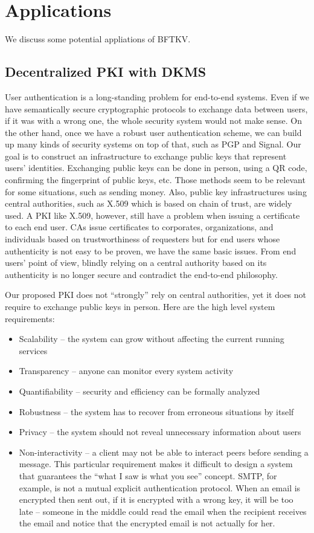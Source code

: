 \section{Applications}
We discuss some potential appliations of BFTKV.

\subsection{Decentralized PKI with DKMS}

User authentication is a long-standing problem for end-to-end
systems. Even if we have semantically secure cryptographic protocols
to exchange data between users, if it was with a wrong one, the whole
security system would not make sense. On the other hand, once we have
a robust user authentication scheme, we can build up many kinds of
security systems on top of that, such as PGP and Signal. Our goal is
to construct an infrastructure to exchange public keys that represent
users' identities. Exchanging public keys can be done in person,
using a QR code, confirming the fingerprint of public keys, etc. Those
methods seem to be relevant for some situations, such as sending
money. Also, public key infrastructures using central authorities,
such as X.509 which is based on chain of trust, are widely used. A PKI
like X.509, however, still have a problem when issuing a certificate
to each end user. CAs issue certificates to corporates, organizations,
and individuals based on trustworthiness of requesters but for end
users whose authenticity is not easy to be proven, we have the same
basic issues. From end users' point of view, blindly relying on a
central authority based on its authenticity is no longer secure and
contradict the end-to-end philosophy.

Our proposed PKI does not ``strongly'' rely on central authorities,
yet it does not require to exchange public keys in person. Here are
the high level system requirements:
\begin{itemize}
\item Scalability -- the system can grow without affecting the current running services
\item Transparency -- anyone can monitor every system activity
\item Quantifiability -- security and efficiency can be formally analyzed
\item Robustness -- the system has to recover from erroneous situations by itself
\item Privacy -- the system should not reveal unnecessary information about users
\item Non-interactivity -- a client may not be able to interact peers
before sending a message. This particular requirement makes it
difficult to design a system that guarantees the ``what I saw is what
you see'' concept. SMTP, for example, is not a mutual explicit
authentication protocol. When an email is encrypted then sent out, if
it is encrypted with a wrong key, it will be too late -- someone in
the middle could read the email when the recipient receives the email
and notice that the encrypted email is not actually for her.
\end{itemize}

